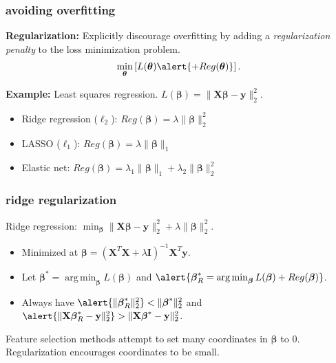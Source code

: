 \documentclass[handout,compress]{beamer}
\newcommand{\bs}[1]{\boldsymbol{#1}}
\newcommand{\bv}[1]{\mathbf{#1}}
\DeclareMathOperator*{\argmin}{arg\,min}
\begin{document}
\begin{frame}
	\frametitle{avoiding overfitting}
	\textbf{Regularization:}
	Explicitly discourage overfitting by adding a \emph{regularization penalty} to the loss minimization problem.  
	\begin{align*}
		\min_{\bs{\theta}} \left[ L(\bs{\theta}) \alert{+ Reg(\bs{\theta})} \right].
	\end{align*}
	
	\textbf{Example:} Least squares regression. $L(\bs{\beta}) = \|\bv{X}\bs{\beta} - \bv{y}\|_2^2$.
	\begin{itemize}
		\item Ridge regression ($\ell_2$): \alert{$Reg(\bs{\beta}) = \lambda \|\bs{\beta}\|_2^2$}
		\item LASSO ($\ell_1$): \alert{$Reg(\bs{\beta}) = \lambda \|\bs{\beta}\|_1$}
		\item Elastic net: \alert{$Reg(\bs{\beta}) = \lambda_1 \|\bs{\beta}\|_1 + \lambda_2 \|\bs{\beta}\|_2^2$}
	\end{itemize}
\end{frame}

\begin{frame}
	\frametitle{ridge regularization}
	\begin{center}
		Ridge regression: $\min_{\bs{\beta}} \|\bv{X}\bs{\beta} - \bv{y}\|_2^2 + \lambda \|\bs{\beta}\|_2^2$.
	\end{center}
\begin{itemize}
	\item Minimized at $\bs{\beta} = (\bv{X}^T\bv{X} + \lambda\bv{I})^{-1}\bv{X}^T\bv{y}$. 
	\item Let $\bs{\beta}^* = \argmin_{\bs{\beta}} L(\bs{\beta})$ and $\alert{\bs{\beta}_R^* = \argmin_{\bs{\beta}} L(\bs{\beta}) + Reg(\bs{\beta})}$. 
	\item Always have  $\alert{\|\bs{\beta}_R^*\|_2^2} < \|\bs{\beta}^*\|_2^2$ and $\alert{\|\bv{X}\bs{\beta}_R^* - \bv{y}\|_2^2} > \|\bv{X}\bs{\beta}^* - \bv{y}\|_2^2$.
\end{itemize}
\vspace{-1em}
	\begin{center}
	Feature selection methods attempt to set many coordinates in $\bs{\beta}$ to 0. Regularization encourages coordinates to be small. 
	\end{center}
\end{frame}
\end{document}
